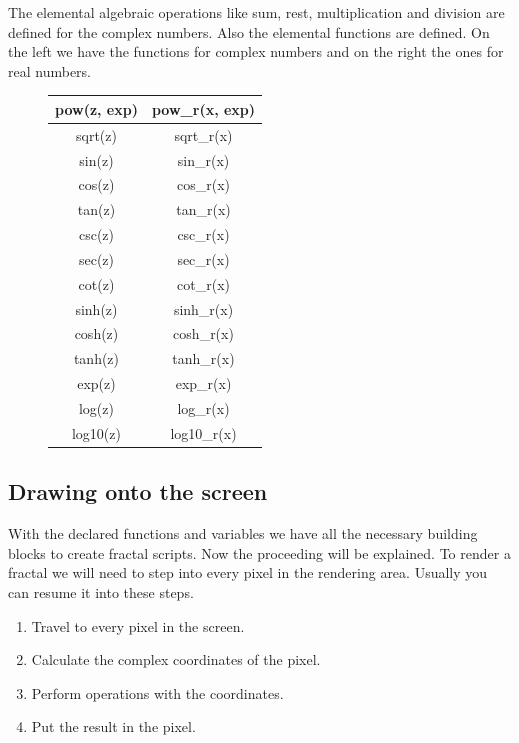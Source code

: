 \documentclass[oneside]{book}
\begin{document}
The elemental algebraic operations like sum, rest, multiplication and division are defined for the complex numbers. Also the elemental functions are defined. On the left we have the functions for complex numbers and on the right the ones for real numbers.

\begin{figure}[h!]
	\centering
	\begin{tabular}{|c|c|}
		\hline 
		pow(z, exp) & pow\_r(x, exp) \\ 
		\hline 
		sqrt(z) & sqrt\_r(x) \\ 
		\hline 
		sin(z) & sin\_r(x) \\ 
		\hline 
		cos(z) & cos\_r(x) \\ 
		\hline 
		tan(z) & tan\_r(x) \\ 
		\hline 
		csc(z) & csc\_r(x) \\ 
		\hline 
		sec(z) & sec\_r(x) \\ 
		\hline 
		cot(z) & cot\_r(x) \\ 
		\hline 
		sinh(z) & sinh\_r(x) \\ 
		\hline 
		cosh(z) & cosh\_r(x) \\ 
		\hline 
		tanh(z) & tanh\_r(x) \\ 
		\hline 
		exp(z) & exp\_r(x) \\ 
		\hline 
		log(z) & log\_r(x) \\ 
		\hline 
		log10(z) & log10\_r(x) \\ 
		\hline 
	\end{tabular}
\end{figure}

\subsection{Drawing onto the screen}
With the declared functions and variables we have all the necessary building blocks to create fractal scripts. Now the proceeding will be explained. To render a fractal we will need to step into every pixel in the rendering area. Usually you can resume it into these steps.

\begin{enumerate}
  \item Travel to every pixel in the screen.
  \item Calculate the complex coordinates of the pixel.
  \item Perform operations with the coordinates.
  \item Put the result in the pixel.
\end{enumerate}
\end{document}
